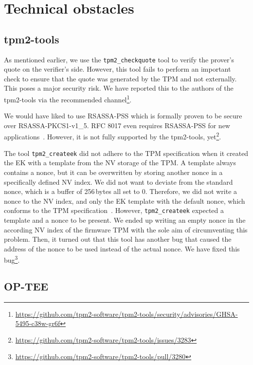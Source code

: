 \section{Technical obstacles}

\subsection{tpm2-tools}

As mentioned earlier, we use the \texttt{tpm2\_checkquote} tool to verify the prover's quote on the verifier's side.
However, this tool fails to perform an important check to ensure that the quote was generated by the TPM and not externally.
This poses a major security risk.
We have reported this to the authors of the tpm2-tools via the recommended channel\footnote{\url{https://github.com/tpm2-software/tpm2-tools/security/advisories/GHSA-5495-c38w-gr6f}}.

We would have liked to use RSASSA-PSS which is formally proven to be secure over RSASSA-PKCS1-v1\_5.
RFC 8017 even requires RSASSA-PSS for new applications~\cite{Moriarty2016}.
However, it is not fully supported by the tpm2-tools, yet\footnote{\url{https://github.com/tpm2-software/tpm2-tools/issues/3283}}.

The tool \texttt{tpm2\_createek} did not adhere to the TPM specification when it created the EK with a template from the NV storage of the TPM\@.
A template always contains a nonce, but it can be overwritten by storing another nonce in a specifically defined NV index.
We did not want to deviate from the standard nonce, which is a buffer of 256\,bytes all set to 0.
Therefore, we did not write a nonce to the NV index, and only the EK template with the default nonce, which conforms to the TPM specification~\cite{tcg-ek}.
However, \texttt{tpm2\_createek} expected a template and a nonce to be present.
We ended up writing an empty nonce in the according NV index of the firmware TPM with the sole aim of circumventing this problem.
Then, it turned out that this tool has another bug that caused the address of the nonce  to be used instead of the actual nonce\@.
We have fixed this bug\footnote{\url{https://github.com/tpm2-software/tpm2-tools/pull/3280}}.


\subsection{OP-TEE}


